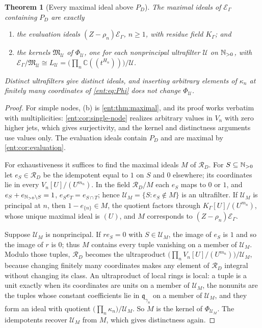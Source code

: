 \documentclass[11pt]{article}
\newtheorem{theorem}{Theorem}[section]
\theoremstyle{plain}
\theoremstyle{plain}
\theoremstyle{plain}
\theoremstyle{definition}
\theoremstyle{definition}
\theoremstyle{definition}
\theoremstyle{definition}
\theoremstyle{remark}
\newcommand{\C}{\mathbb C}\newcommand{\R}{\mathbb R}
\newcommand{\K}{K_\Gamma}\newcommand{\KD}{K_\Delta}
\newcommand{\E}{\mathcal E_\Gamma}
\newcommand{\RD}{\mathcal R_D}\newcommand{\Ucal}{\mathcal U}
\begin{document}
\begin{theorem}[Every maximal ideal above $P_D$]\label{ent:sm:thm:maximal-all}
The maximal ideals of $\E$ containing $P_D$ are exactly
\begin{enumerate}[label=\textnormal{(\alph*)},leftmargin=2em]
\item the evaluation ideals $(Z-\rho_n)\E$, $n\ge1$, with residue field
$\K$; and
\item the kernels $\mathfrak M_\Ucal$ of $\Phi_\Ucal$, one for each
nonprincipal ultrafilter $\Ucal$ on $\mathbb N_{>0}$, with
$\E/\mathfrak M_\Ucal\cong L_\Ucal=\bigl(\prod_n\C((t^{H_n}))\bigr)/\Ucal$.
\end{enumerate}
Distinct ultrafilters give distinct ideals, and inserting arbitrary elements
of $\kappa_n$ at finitely many coordinates of \eqref{ent:eq:Phi} does not
change $\Phi_\Ucal$.
\end{theorem}
\begin{proof}
For simple nodes, (b) is \cref{ent:thm:maximal}, and its proof works verbatim
with multiplicities: \cref{ent:cor:single-node} realizes arbitrary values in
$V_n$ with zero higher jets, which gives surjectivity, and the kernel and
distinctness arguments use values only. The evaluation ideals contain $P_D$
and are maximal by \cref{ent:cor:evaluation}.

For exhaustiveness it suffices to find the maximal ideals $M$ of $\RD$. For
$S\subseteq\mathbb N_{>0}$ let $e_S\in\RD$ be the idempotent equal to $1$ on $S$ and
$0$ elsewhere; its coordinates lie in every $V_n[U]/(U^{m_n})$. In the field
$\RD/M$ each $e_S$ maps to $0$ or $1$, and $e_S+e_{\mathbb N_{>0}\setminus S}=1$,
$e_Se_T=e_{S\cap T}$; hence $\Ucal_M=\{S:e_S\notin M\}$ is an ultrafilter. If
$\Ucal_M$ is principal at $n$, then $1-e_{\{n\}}\in M$, the quotient factors
through $\K[U]/(U^{m_n})$, whose unique maximal ideal is $(U)$, and $M$
corresponds to $(Z-\rho_n)\E$.

Suppose $\Ucal_M$ is nonprincipal. If $re_S=0$ with $S\in\Ucal_M$, the image
of $e_S$ is $1$ and so the image of $r$ is $0$; thus $M$ contains every tuple
vanishing on a member of $\Ucal_M$. Modulo those tuples, $\RD$ becomes the
ultraproduct $\bigl(\prod_nV_n[U]/(U^{m_n})\bigr)/\Ucal_M$, because changing
finitely many coordinates makes any element of $\RD$ integral without
changing its class. An ultraproduct of local rings is local: a tuple is a
unit exactly when its coordinates are units on a member of $\Ucal_M$, the
nonunits are the tuples whose constant coefficients lie in
$\mathfrak q_{\gamma_n}$ on a member of $\Ucal_M$, and they form an ideal
with quotient $\bigl(\prod_n\kappa_n\bigr)/\Ucal_M$. So $M$ is the kernel of
$\Phi_{\Ucal_M}$. The idempotents recover $\Ucal_M$ from $M$, which gives
distinctness again.
\end{proof}
\end{document}
